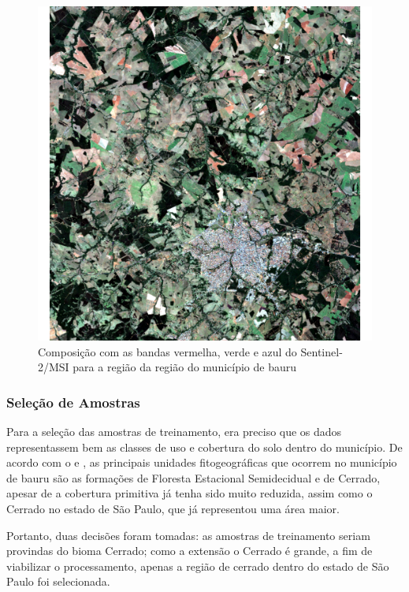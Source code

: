 \begin{figure}[H]
    \centering
    \caption{Composição com as bandas vermelha, verde e azul do Sentinel-2/MSI para a região da região do município de bauru} \label{fig-fluxograma}
    \includegraphics[scale=0.55]{figs/plot_sentinel-rgb.pdf}
\end{figure}

\subsubsection{Seleção de Amostras}\label{selecao-de-amostras}

    Para a seleção das amostras de treinamento, era preciso que os dados
representassem bem as classes de uso e cobertura do solo dentro do
município. De acordo com o \cite{plano-mata-atlantica} e \cite{cavassan2013bauru}, as principais unidades fitogeográficas que ocorrem no município de bauru são as formações de Floresta Estacional Semidecidual e de Cerrado, apesar de a cobertura primitiva já tenha sido muito reduzida, assim como o Cerrado no estado de São Paulo, que já representou uma área maior.

    Portanto, duas decisões foram tomadas: as amostras de treinamento
seriam provindas do bioma Cerrado; como a extensão o Cerrado é grande, a
fim de viabilizar o processamento, apenas a região de cerrado dentro do
estado de São Paulo foi selecionada.

